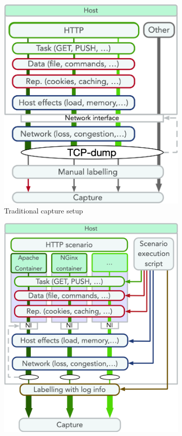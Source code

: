 \documentclass[runningheads]{llncs}
\begin{document}
\begin{figure}
\centering
\begin{subfigure}[b]{0.48\textwidth}
\includegraphics[width=\textwidth]{images/VM_setup_final.png}
\caption{Traditional capture setup}
\end{subfigure}
\begin{subfigure}[b]{0.48\textwidth}
\includegraphics[width=\textwidth]{images/Docker_setup_final.png}

\end{subfigure}
\end{figure}
\end{document}
